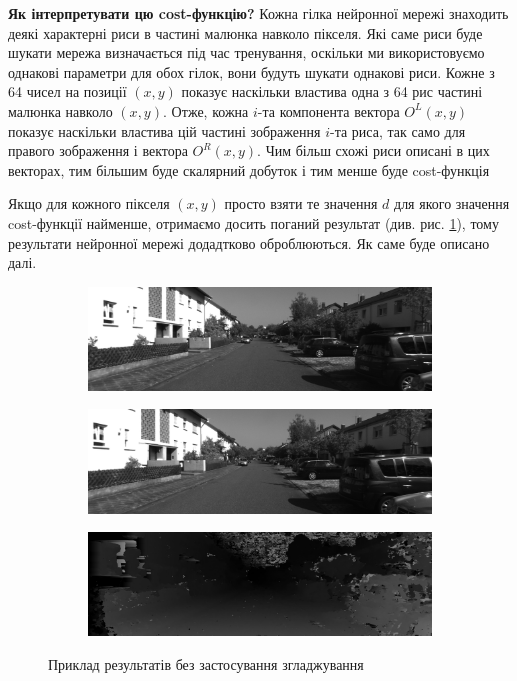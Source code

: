 \documentclass[11pt]{article}
\theoremstyle{definition}
\begin{document}
\textbf{Як інтерпретувати цю cost-функцію?} Кожна гілка нейронної мережі знаходить деякі характерні риси в частині малюнка навколо пікселя. Які саме риси буде шукати мережа визначається під час тренування, оскільки ми використовуємо однакові параметри для обох гілок, вони будуть шукати однакові риси. Кожне з 64 чисел на позиції $(x, y)$ показує наскільки властива одна з 64 рис частині малюнка навколо $(x,y)$. Отже, кожна $i$-та компонента вектора $O^L(x,y)$ показує наскільки властива цій частині зображення $i$-та риса, так само для правого зображення і вектора $O^R(x,y)$. Чим більш схожі риси описані в цих векторах, тим більшим буде скалярний добуток і тим менше буде cost-функція

Якщо для кожного пікселя $(x,y)$ просто взяти те значення $d$ для якого значення cost-функції найменше, отримаємо досить поганий результат (див. рис. \ref{fig:bad_approach_example}), тому результати нейронної мережі додадтково оброблюються. Як саме буде описано далі.

 \begin{figure}[h]
 	\begin{subfigure}{\textwidth}
 		\includegraphics[width=\linewidth]{kitti_example_left}
 		\centering
 	\end{subfigure}
 	\begin{subfigure}{\textwidth}
 		\includegraphics[width=\linewidth]{kitti_example_right}
 		\centering
 	\end{subfigure}
	\begin{subfigure}{\textwidth}
		\includegraphics[width=\linewidth]{no_smoothing_result}
		\centering
	\end{subfigure}
 	\centering
 	\caption{Приклад результатів без застосування згладжування}
 	\label{fig:bad_approach_example}
 \end{figure}
\end{document}

